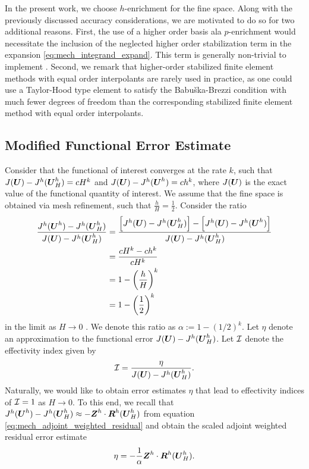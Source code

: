 In the present work, we choose $h$-enrichment for the fine space.
Along with the previously discussed accuracy considerations, we are motivated
to do so for two additional reasons. First, the use of a higher order basis
ala $p$-enrichment would necessitate the inclusion of the neglected higher
order stabilization term in the expansion \eqref{eq:mech_integrand_expand}.
This term is generally non-trivial to implement \cite{maniatty2002higher}.
Second, we remark that higher-order stabilized finite element methods with
equal order interpolants are rarely used in practice, as one could use a
Taylor-Hood type element \cite{taylor1973numerical} to satisfy the
Babu\v{s}ka-Brezzi condition with much fewer degrees of freedom than the
corresponding stabilized finite element method with equal order interpolants.

\subsection{Modified Functional Error Estimate}

Consider that the functional of interest converges at the rate $k$, such
that $J(\boldsymbol{U}) - J^h(\boldsymbol{U}^h_H) = cH^k$ and $J(\boldsymbol{U}) - J^h(\boldsymbol{U}^h) =
ch^k$, where $J(\boldsymbol{U})$ is the exact value of the functional quantity of
interest. We assume that the fine space is obtained via mesh refinement,
such that $\frac{h}{H} = \frac12$. Consider the ratio
%
\begin{gather}
\begin{aligned}
\frac{ J^h (\boldsymbol{U}^h) - J^h(\boldsymbol{U}^h_H) }{ J(\boldsymbol{U}) - J^h(\boldsymbol{U}^h_H) }
&= \frac{\left[ J^h(\boldsymbol{U}) - J^h(\boldsymbol{U}^h_H) \right] -
\left[ J^h(\boldsymbol{U}) - J^h(\boldsymbol{U}^h) \right] }
{ J(\boldsymbol{U}) - J^h(\boldsymbol{U}^h_H) } \\
&= \frac{c H^k - ch^k}{c H^k} \\
&= 1 - \left( \frac{h}{H} \right)^k \\
&= 1 - \left( \frac12 \right)^k
\end{aligned}
\end{gather}
%
in the limit as $H \to 0$ \cite{fidkowski2011review}. We denote this ratio
as $\alpha := 1 - (1/2)^k$. Let $\eta$ denote an approximation to the
functional error $J(\boldsymbol{U}) - J^h(\boldsymbol{U}^h_H)$. Let $\mathcal{I}$ denote the
effectivity index given by
%
\begin{gather}
\mathcal{I} = \frac{\eta}{ J(\boldsymbol{U}) - J^h(\boldsymbol{U}^h_H) }.
\label{eq:mech_effectivity}
\end{gather}
%
Naturally, we would like to obtain error estimates $\eta$ that lead to
effectivity indices of $\mathcal{I} = 1$ as $H \to 0$. To this end, we recall that
$J^h(\boldsymbol{U}^h) - J^h(\boldsymbol{U}^h_H) \approx - \boldsymbol{Z}^h \cdot
\boldsymbol{R}^h(\boldsymbol{U}^h_H)$ from equation \eqref{eq:mech_adjoint_weighted_residual}
and obtain the scaled adjoint weighted residual error estimate
%
\begin{gather}
\eta = - \frac{1}{\alpha} \boldsymbol{Z}^h \cdot \boldsymbol{R}^h(\boldsymbol{U}^h_H).
\label{eq:mech_error_estimate}
\end{gather}

